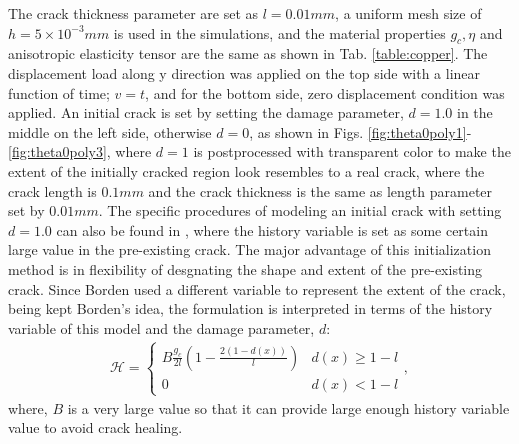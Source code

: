 \documentclass[3p,10pt,sort&compress]{elsarticle}
\begin{document}
The crack thickness parameter are set as $l=0.01mm$, a uniform mesh size of $h=5\times10^{-3}mm$ is used in the simulations, and the material properties $g_c,\eta$ and anisotropic elasticity tensor are the same as shown in Tab. \ref{table:copper}. The displacement load along y direction was applied on the top side with a linear function of time; $v=t$, and for the bottom side, zero displacement condition was applied. An initial crack is set by setting the damage parameter, $d=1.0$ in the middle on the left side, otherwise $ d=0 $, as shown in Figs. \ref{fig:theta0poly1}-\ref{fig:theta0poly3}, where $ d = 1 $ is postprocessed with transparent color to make the extent of the initially cracked region look resembles to a real crack, where the crack length is $0.1mm$ and the crack thickness is the same as length parameter set by $0.01mm$. The specific procedures of modeling an initial crack with setting $d=1.0$ can also be found in \cite{borden2012phase}, where the history variable is set as some certain large value in the pre-existing crack. The major advantage of this initialization method is in flexibility of desgnating the shape and extent of the pre-existing crack. Since Borden used a different variable to represent the extent of the crack, being kept Borden's idea, the formulation is interpreted in terms of the history variable of this model and the damage parameter, $d$:
\begin{eqnarray}
  \mathcal{H} = \begin{cases}
  B \frac{g_c}{2l}(1-\frac{2(1-d(x))}{l}) & d(x)\geq 1-l \\
  0 & d(x)<1-l
\end{cases},
\end{eqnarray}
where, $B$ is a very large value so that it can provide large enough history variable value to avoid crack healing.
%
%
\end{document}
